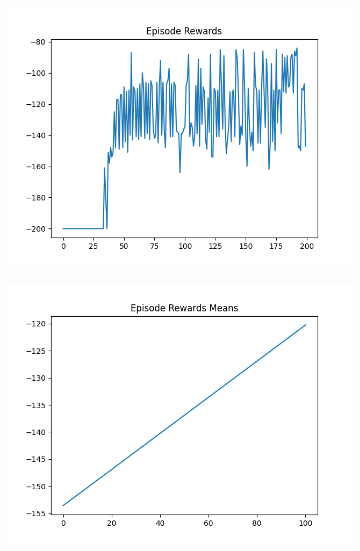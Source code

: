 \begin{figure}[H]
    \centering
    \begin{subfigure}{.47\linewidth}
        \centering
        \includegraphics[width=\textwidth]{mountain/2024-06-15_13-36-42_dqn_mountaincar_episode_rewards.png}
    \end{subfigure}
    \begin{subfigure}{.47\linewidth}
        \centering
        \includegraphics[width=\textwidth]{mountain/2024-06-15_13-36-42_dqn_mountaincar_episode_rewards_means.png}
    \end{subfigure}
    \begin{subfigure}{.47\linewidth}
        \centering

\end{subfigure}
\end{figure}
